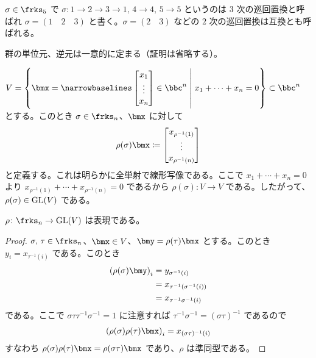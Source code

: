 \documentclass[a4paper]{ltjsarticle}
\begin{document}
\begin{exm}[巡回置換]
  $\sigma\in\frks_5$ で $\sigma\colon 1\to 2\to 3\to 1,\,4\to 4,\,5\to 5$ というのは $3$ 次の巡回置換と呼ばれ $\sigma = (1\quad 2\quad 3)$ と書く。$\sigma = (2\quad 3)$ などの $2$ 次の巡回置換は互換とも呼ばれる。 %
\end{exm}

\begin{rem}
  群の単位元、逆元は一意的に定まる（証明は省略する）。
\end{rem}

\begin{exm}
  $V = \left\{\bmx = \nbl\begin{bmatrix}
    x_1\\
    \vdots\\
    x_n
  \end{bmatrix}\in\bbc^n\cvert{4}x_1 + \dotsb + x_n = 0\right\}\subset\bbc^n$ とする。このとき $\sigma\in\frks_n$、$\bmx$ に対して
  \begin{equation}
    \rho(\sigma)\bmx\coloneqq\begin{bmatrix}
      x_{\rho^{-1}(1)}\\
      \vdots\\
      x_{\rho^{-1}(n)}
    \end{bmatrix}
  \end{equation}
  と定義する。これは明らかに全単射で線形写像である。ここで $x_1 + \dotsb + x_n = 0$ より $x_{\rho^{-1}(1)} + \dotsb + x_{\rho^{-1}(n)} = 0$ であるから $\rho(\sigma)\colon V\to V$ である。したがって、$\rho(\sigma)\in\text{GL}(V)$ である。
\end{exm}

\begin{prop}
  $\rho\colon\frks_n\to\GL(V)$ は表現である。
\end{prop}

\begin{proof}
  $\sigma,\,\tau\in\frks_n$、$\bmx\in V$、$\bmy = \rho(\tau)\bmx$ とする。このとき $y_i = x_{\tau^{-1}(i)}$ である。このとき
  \begin{equation}
    \begin{aligned}
      \left(\rho(\sigma)\bmy\right)_i ={}&y_{\sigma^{-1}(i)}\\
      ={}&x_{\tau^{-1}\left(\sigma^{-1}(i)\right)}\\
      ={}&x_{\tau^{-1}\sigma^{-1}(i)}
    \end{aligned}
  \end{equation}
  である。ここで $\sigma\tau\tau^{-1}\sigma^{-1} = 1$ に注意すれば $\tau^{-1}\sigma^{-1} = (\sigma\tau)^{-1}$ であるので
  \begin{equation}
    \begin{aligned}
      \left(\rho(\sigma)\rho(\tau)\bmx\right)_i = x_{(\sigma\tau)^{-1}(i)}
    \end{aligned}
  \end{equation}
  すなわち $\rho(\sigma)\rho(\tau)\bmx = \rho(\sigma\tau)\bmx$ であり、$\rho$ は準同型である。
\end{proof}
\end{document}
